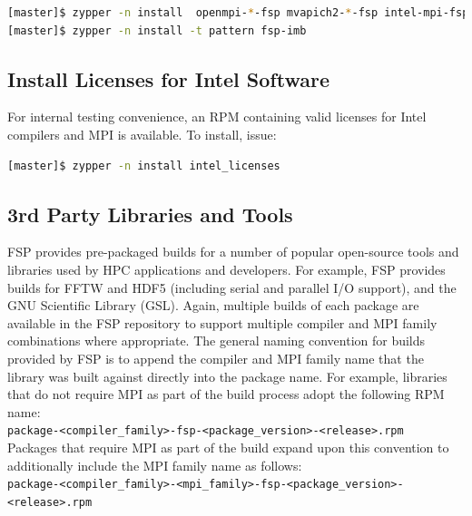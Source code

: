 \documentclass[letterpaper]{article}
\begin{document}
\begin{lstlisting}[language=bash]
[master]$ zypper -n install  openmpi-*-fsp mvapich2-*-fsp intel-mpi-fsp
[master]$ zypper -n install -t pattern fsp-imb
\end{lstlisting}

\subsection{Install Licenses for Intel Software}

For internal testing convenience, an RPM containing valid licenses for Intel
compilers and MPI is available. To install, issue:

\begin{lstlisting}[language=bash,keywords={},upquote=true]
[master]$ zypper -n install intel_licenses
\end{lstlisting}

\subsection{3rd Party Libraries and Tools}

FSP provides pre-packaged builds for a number of popular open-source
tools and libraries used by HPC applications and developers. For
example, FSP provides builds for FFTW and HDF5 (including serial and parallel
I/O support), and the GNU Scientific Library (GSL). Again, multiple builds of
each package are available in the FSP repository to support multiple compiler
and MPI family combinations where appropriate. The general naming convention
for builds provided by FSP is to append the compiler and MPI family name that
the library was built against directly into the package name. For example,
libraries that do not require MPI as part of the build process adopt the
following RPM name: \\

\noindent
\texttt{package-<compiler\_family>-fsp-<package\_version>-<release>.rpm} \\

\noindent Packages that require MPI as part of the build expand upon this convention to
additionally include the MPI family name as follows: \\

\noindent
\texttt{package-<compiler\_family>-<mpi\_family>-fsp-<package\_version>-<release>.rpm} \\
\end{document}
